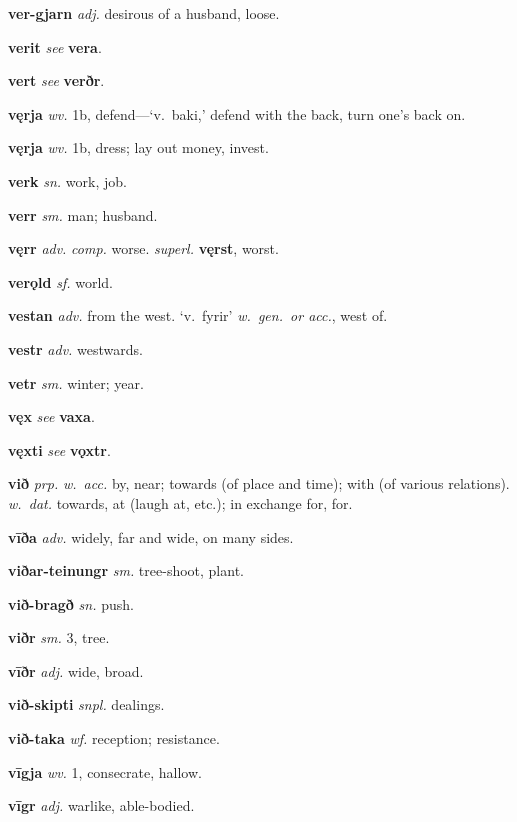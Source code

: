\documentclass[12pt,letterpaper]{book}
\begin{document}
\noindent
\textbf{ver-gjarn} \textit{adj.} desirous of a husband, loose.

\noindent
\textbf{verit} \textit{} \textit{see} \textbf{vera}.

\noindent
\textbf{vert} \textit{} \textit{see} \textbf{verðr}.

\noindent
\textbf{vęrja} \textit{wv.} 1b, defend---`v.\ baki,' defend with the back,
	turn one's back on.

\noindent
\textbf{vęrja} \textit{wv.} 1b, dress; lay out money, invest.

\noindent
\textbf{verk} \textit{sn.} work, job.

\noindent
\textbf{verr} \textit{sm.} man; husband.

\noindent
\textbf{vęrr} \textit{adv.} \textit{comp.} worse.  \textit{superl.}
	\textbf{vęrst}, worst.

\noindent
\textbf{verǫld} \textit{sf.} world.

\noindent
\textbf{vestan} \textit{adv.} from the west.  `v.\ fyrir' \textit{w.\ gen.\ or
	acc.}, west of.

\noindent
\textbf{vestr} \textit{adv.} westwards.

\noindent
\textbf{vetr} \textit{sm.} winter; year.

\noindent
\textbf{vęx} \textit{} \textit{see} \textbf{vaxa}.

\noindent
\textbf{vęxti} \textit{} \textit{see} \textbf{vǫxtr}.

\noindent
\textbf{við} \textit{prp.} \textit{w.\ acc.} by, near; towards (of place
	and time); with (of various relations).  \textit{w.\ dat.} towards, at
	(laugh at, etc.); in exchange for, for.

\noindent
\textbf{vīða} \textit{adv.} widely, far and wide, on many sides.

\noindent
\textbf{viðar-teinungr} \textit{sm.} tree-shoot, plant.

\noindent
\textbf{við-bragð} \textit{sn.} push.

\noindent
\textbf{viðr} \textit{sm.} 3, tree.

\noindent
\textbf{vīðr} \textit{adj.} wide, broad.

\noindent
\textbf{við-skipti} \textit{snpl.} dealings.

\noindent
\textbf{við-taka} \textit{wf.} reception; resistance.

\noindent
\textbf{vīgja} \textit{wv.} 1, consecrate, hallow.

\noindent
\textbf{vīgr} \textit{adj.} warlike, able-bodied.
\end{document}
